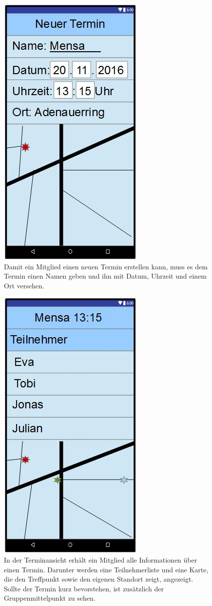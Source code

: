 \documentclass{scrartcl}
\begin{document}
	\newpage
	\begin{figure}[h]
		\centering
		\includegraphics[width=.5\textwidth]{GUI_NeuerTermin.jpg}
		\caption{Damit ein \gls{Mitglied} einen neuen Termin erstellen kann, muss es dem Termin einen Namen geben und ihn mit Datum, Uhrzeit und einem Ort versehen.}
	\end{figure}
	
	\newpage
	\begin{figure}[h]
		\centering
		\includegraphics[width=.5\textwidth]{GUI_Termin.jpg}
		\caption{In der Terminansicht erhält ein \gls{Mitglied} alle Informationen über einen Termin. Darunter werden eine Teilnehmerliste und eine Karte, die den Treffpunkt sowie den eigenen Standort zeigt, angezeigt. Sollte der Termin kurz bevorstehen, ist zusätzlich der Gruppenmittelpunkt zu sehen.}
	\end{figure}
	
	
\newpage
	


\appendix
%
%
\printindex
\glsaddall
\printglossaries
	
\end{document}
